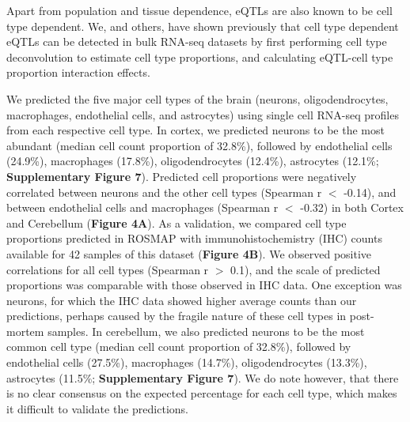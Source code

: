 {{Apart from population and tissue dependence, eQTLs are also known to be cell type dependent. We\cite{raulaguirregamboaDeconvolutionBulkBlood2020}, and others\cite{donovanCellularDeconvolutionGTEx2020,glastonburyCellTypeHeterogeneityAdipose2019}, have shown previously that cell type dependent eQTLs can be detected in bulk RNA-seq datasets by first performing cell type deconvolution to estimate cell type proportions, and calculating eQTL-cell type proportion interaction effects.  

We predicted the five major cell types of the brain (neurons, oligodendrocytes, macrophages, endothelial cells, and astrocytes) using single cell RNA-seq profiles from each respective cell type. In cortex, we predicted neurons to be the most abundant (median cell count proportion of 32.8\%), followed by endothelial cells (24.9\%), macrophages (17.8\%), oligodendrocytes (12.4\%), astrocytes (12.1\%; \textbf{Supplementary Figure 7}). Predicted cell proportions were negatively correlated between neurons and the other cell types (Spearman r $<$ -0.14), and between endothelial cells and macrophages (Spearman r $<$ -0.32) in both Cortex and Cerebellum (\textbf{Figure 4A}). As a validation, we compared cell type proportions predicted in ROSMAP with immunohistochemistry (IHC) counts available for 42 samples of this dataset\cite{patrickDeconvolvingContributionsCelltype2020} (\textbf{Figure 4B}). We observed positive correlations for all cell types (Spearman r $>$ 0.1), and the scale of predicted proportions was comparable with those observed in IHC data. One exception was neurons, for which the IHC data showed higher average counts than our predictions, perhaps caused by the fragile nature of these cell types in post-mortem samples. In cerebellum, we also predicted neurons to be the most common cell type (median cell count proportion of 32.8\%), followed by endothelial cells (27.5\%), macrophages (14.7\%), oligodendrocytes (13.3\%), astrocytes (11.5\%; \textbf{Supplementary Figure 7}). We do note however, that there is no clear consensus on the expected percentage for each cell type, which makes it difficult to validate the predictions\cite{herculano-houzelHumanBrainNumbers2009,vonbartheldSearchTrueNumbers2016}. 

}}
